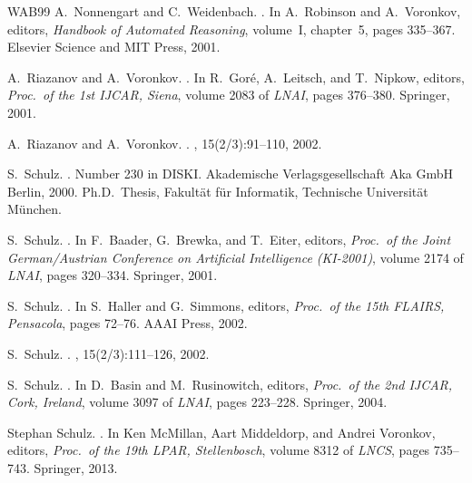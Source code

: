\documentclass{report}
\begin{document}
\begin{thebibliography}{WAB{\etalchar{+}}99}
A.~Nonnengart and C.~Weidenbach.
.
\newblock In A.~Robinson and A.~Voronkov, editors, {\em Handbook of Automated
  Reasoning}, volume~I, chapter~5, pages 335--367. Elsevier Science and MIT
  Press, 2001.

A.~Riazanov and A.~Voronkov.
.
\newblock In R.~Gor{\'e}, A.~Leitsch, and T.~Nipkow, editors, {\em Proc.\ of
  the 1st IJCAR, Siena}, volume 2083 of {\em LNAI}, pages 376--380. Springer,
  2001.

A.~Riazanov and A.~Voronkov.
.
, 15(2/3):91--110, 2002.

S.~Schulz.
.
\newblock Number 230 in DISKI. Akademische Verlagsgesellschaft Aka GmbH Berlin,
  2000.
\newblock Ph.D.~Thesis, Fakult{\"a}t f{\"u}r Informatik, Technische
  Universit{\"a}t M{\"u}nchen.

S.~Schulz.
.
\newblock In F.~Baader, G.~Brewka, and T.~Eiter, editors, {\em Proc.\ of the
  Joint German/Austrian Conference on Artificial Intelligence (KI-2001)},
  volume 2174 of {\em LNAI}, pages 320--334. Springer, 2001.

S.~Schulz.
.
\newblock In S.~Haller and G.~Simmons, editors, {\em Proc.\ of the 15th FLAIRS,
  Pensacola}, pages 72--76. AAAI Press, 2002.

S.~Schulz.
.
, 15(2/3):111--126, 2002.

S.~Schulz.
.
\newblock In D.~Basin and M.~Rusinowitch, editors, {\em Proc.\ of the 2nd
  IJCAR, Cork, Ireland}, volume 3097 of {\em LNAI}, pages 223--228. Springer,
  2004.

Stephan Schulz.
.
\newblock In Ken McMillan, Aart Middeldorp, and Andrei Voronkov, editors, {\em
  Proc.\ of the 19th LPAR, Stellenbosch}, volume 8312 of {\em LNCS}, pages
  735--743. Springer, 2013.


\end{thebibliography}
\end{document}
